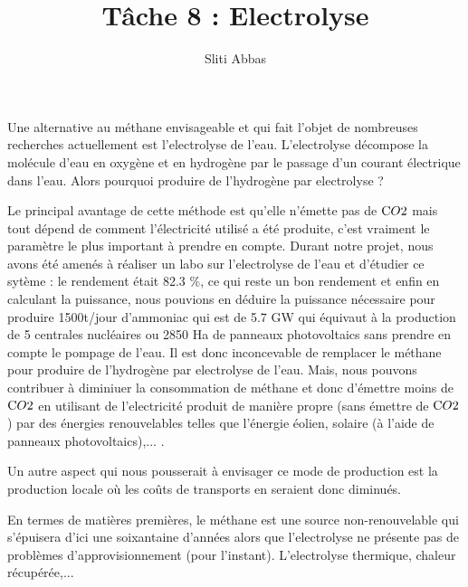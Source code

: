 \documentclass[10pt,a4paper]{article}
\title{Tâche 8 : Electrolyse}
\author{Sliti Abbas}
\begin{document}
\maketitle

Une alternative au méthane envisageable et qui fait l'objet de nombreuses recherches actuellement est l'electrolyse de l'eau. L'electrolyse décompose la molécule d'eau en oxygène et en hydrogène par le passage d'un courant électrique dans l'eau. Alors pourquoi produire de l'hydrogène par electrolyse ? 

Le principal avantage de cette méthode est qu'elle n'émette pas de $\ce CO2$ mais tout dépend de comment l'électricité utilisé a été produite, c'est vraiment le paramètre le plus important à prendre en compte. Durant notre projet, nous avons été amenés à réaliser un labo sur l'electrolyse de l'eau et d'étudier ce sytème : le rendement était 82.3 \%, ce qui reste un bon rendement et enfin en calculant la puissance, nous pouvions en déduire la puissance nécessaire pour produire 1500t/jour d'ammoniac qui est de 5.7 GW qui équivaut à la production de 5 centrales nucléaires ou 2850 Ha de panneaux photovoltaics sans prendre en compte le pompage de l'eau. Il est donc inconcevable de remplacer le méthane pour produire de l'hydrogène par electrolyse de l'eau. Mais, nous pouvons contribuer à diminiuer la consommation de méthane et donc d'émettre moins de $\ce CO2$ en utilisant de l'electricité produit de manière propre (sans émettre de $\ce CO2$) par des énergies renouvelables telles que l'énergie éolien, solaire (à l'aide de panneaux photovoltaics),...  .

Un autre aspect qui nous pousserait à envisager ce mode de production est la production locale où les coûts de transports en seraient donc diminués. 

En termes de matières premières, le méthane est une source non-renouvelable qui s'épuisera d'ici une soixantaine d'années alors que l'electrolyse ne présente pas de problèmes d'approvisionnement (pour l'instant). L'electrolyse thermique, chaleur récupérée,...
\end{document}
